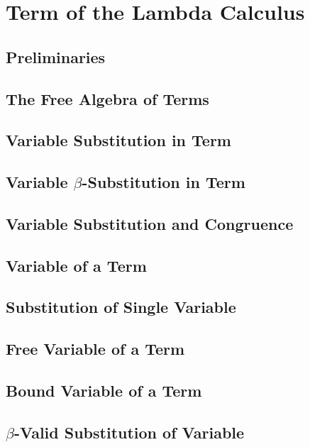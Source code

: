 \section{Term of the Lambda Calculus}
    \subsection{Preliminaries}
        
    \subsection{The Free Algebra of Terms}
        
    \subsection{Variable Substitution in Term}
        
    \subsection{Variable $\beta$-Substitution in Term}
        
    \subsection{Variable Substitution and Congruence}
        
    \subsection{Variable of a Term}
        
    \subsection{Substitution of Single Variable}
        
    \subsection{Free Variable of a Term}
        
    \subsection{Bound Variable of a Term}
        
     \subsection{$\beta$-Valid Substitution of Variable}
        

